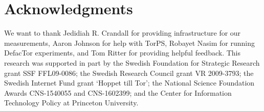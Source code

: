 \section*{Acknowledgments}
We want to thank Jedidiah R. Crandall for providing infrastructure for our
measurements, Aaron Johnson for help with TorPS, Robayet Nasim for running
DefacTor experiments, and Tom Ritter for providing
helpful feedback.
%
This research was supported in part by the Swedish Foundation for Strategic
Research grant SSF FFL09-0086; the Swedish Research Council grant VR 2009-3793;
the Swedish Internet Fund grant `Hoppet till Tor'; the National Science
Foundation Awards CNS-1540055 and CNS-1602399; and the Center for Information
Technology Policy at Princeton University.

